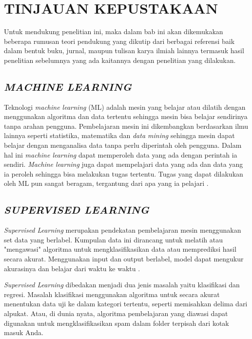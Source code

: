 \fancyhf{}
\fancyfoot[C]{\thepage}
\chapter{TINJAUAN KEPUSTAKAAN}

\par Untuk mendukung penelitian ini, maka dalam bab ini akan dikemukakan beberapa rumusan teori pendukung yang dikutip dari berbagai referensi baik dalam bentuk buku, jurnal, maupun tulisan karya ilmiah lainnya termasuk hasil penelitian sebelumnya yang ada kaitannya dengan penelitian yang dilakukan.

\section{\textit{MACHINE LEARNING}}
Teknologi \textit{machine learning} (ML) adalah mesin yang belajar atau dilatih dengan menggunakan algoritma dan data tertentu sehingga mesin bisa belajar sendirinya tanpa arahan pengguna. Pembelajaran mesin ini dikembangkan berdasarkan ilmu lainnya seperti statistika, matematika dan \textit{data mining} sehingga mesin dapat belajar dengan menganalisa data tanpa perlu diperintah oleh pengguna. Dalam hal ini \textit{machine learning} dapat memperoleh data yang ada dengan perintah ia sendiri. \textit{Machine learning} juga dapat mempelajari data yang ada dan data yang ia peroleh sehingga bisa melakukan tugas tertentu. Tugas yang dapat dilakukan oleh ML pun sangat beragam, tergantung dari apa yang ia pelajari \citep{Baker2019}.

\section{\uppercase{\textit{SUPERVISED LEARNING}}}
\textit{Supervised Learning} merupakan pendekatan pembelajaran mesin menggunakan set data yang berlabel. Kumpulan data ini dirancang untuk melatih atau "mengawasi" algoritma untuk mengklasifikasikan data atau memprediksi hasil secara akurat. Menggunakan input dan output berlabel, model dapat mengukur akurasinya dan belajar dari waktu ke waktu \citep{Gramejo2020}.

\par \textit{Supervised Learning} dibedakan menjadi dua jenis masalah yaitu klasifikasi dan regresi. Masalah klasifikasi menggunakan algoritma untuk secara akurat menentukan data uji ke dalam kategori tertentu, seperti memisahkan delima dari alpukat. Atau, di dunia nyata, algoritma pembelajaran yang diawasi dapat digunakan untuk mengklasifikasikan spam dalam folder terpisah dari kotak masuk Anda.


